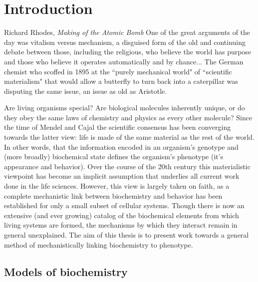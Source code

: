 \chapter{Introduction}

\begin{chapquote}{Richard Rhodes, \textit{Making of the Atomic Bomb}\supercite{Rhodes:1986ux}}
One of the great arguments of the day was vitalism versus mechanism, a disguised form of the old and continuing debate between those, including the religious, who believe the world has purpose and those who believe it operates automatically and by chance... The German chemist who scoffed in 1895 at the ``purely mechanical world" of ``scientific materialism" that would allow a butterfly to turn back into a caterpillar was disputing the same issue, an issue as old as Aristotle.
\end{chapquote}

Are living organisms special? Are biological molecules inherently unique, or do they obey the same laws of chemistry and physics as every other molecule? Since the time of Mendel\supercite{Johannsen:2014iv} and Cajal\supercite{hellman2001great} the scientific consensus has been converging towards the latter view: life is made of the same material as the rest of the world. In other words, that the information encoded in an organism’s genotype and (more broadly) biochemical state defines the organism’s phenotype (\ie it’s appearance and behavior). Over the course of the 20th century this materialistic viewpoint has become an implicit assumption that underlies all current work done in the life sciences. However, this view is largely taken on faith, as a complete mechanistic link between biochemistry and behavior has been established for only a small subset of cellular systems. Though there is now an extensive (and ever growing) catalog of the biochemical elements from which living systems are formed, the mechanisms by which they interact remain in general unexplained. The aim of this thesis is to present work towards a general method of mechanistically linking biochemistry to phenotype.

\section{Models of biochemistry}

